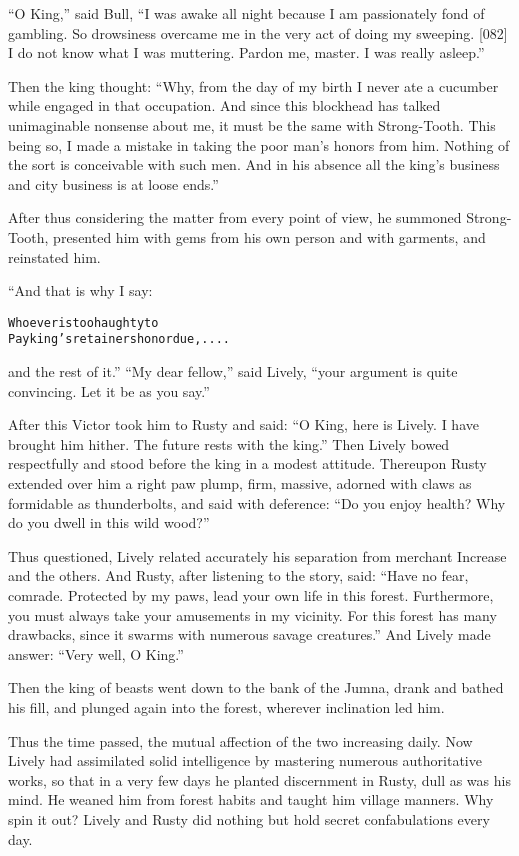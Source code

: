 \documentclass{article}
\renewenvironment{verbatim}{\begin{alltt}\normalfont\begin{centering}}{\end{centering}\end{alltt}}
\begin{document}
``O King,'' said Bull,
``I was awake all night because I am passionately fond of gambling. So drowsiness overcame me in the very act of doing my sweeping. [082] I do not know what I was muttering. Pardon me, master. I was really asleep.''

Then the king thought:
``Why, from the day of my birth I never ate a cucumber while engaged in that occupation. And since this blockhead has talked unimaginable nonsense about me, it must be the same with Strong-Tooth. This being so, I made a mistake in taking the poor man's honors from him. Nothing of the sort is conceivable with such men. And in his absence all the king's business and city business is at loose ends.''

After thus considering the matter from every point of view, he
summoned Strong-Tooth, presented him with gems from his own person
and with garments, and reinstated him.

“And that is why I say:

\begin{verbatim}
Whoever is too haughty to
Pay king's retainers honor due, ....
\end{verbatim}
and the rest of it.” ``My dear fellow,'' said Lively,
``your argument is quite convincing. Let it be as you say.''

After this Victor took him to Rusty and said:
``O King, here is Lively. I have brought him hither. The future rests with the king.''
Then Lively bowed respectfully and stood before the king in a
modest attitude. Thereupon Rusty extended over him a right paw
plump, firm, massive, adorned with claws as formidable as
thunderbolts, and said with deference:
``Do you enjoy health? Why do you dwell in this wild wood?''

Thus questioned, Lively related accurately his separation from
merchant Increase and the others. And Rusty, after listening to the
story, said:
``Have no fear, comrade. Protected by my paws, lead your own life in this forest. Furthermore, you must always take your amusements in my vicinity. For this forest has many drawbacks, since it swarms with numerous savage creatures.''
And Lively made answer: ``Very well, O King.''

Then the king of beasts went down to the bank of the Jumna, drank
and bathed his fill, and plunged again into the forest, wherever
inclination led him.

Thus the time passed, the mutual affection of the two increasing
daily. Now Lively had assimilated solid intelligence by mastering
numerous authoritative works, so that in a very few days he planted
discernment in Rusty, dull as was his mind. He weaned him from
forest habits and taught him village manners. Why spin it out?
Lively and Rusty did nothing but hold secret confabulations every
day.
\end{document}
